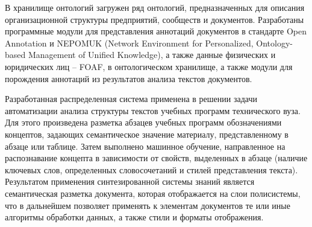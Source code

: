 \documentclass[12pt,a4paper]{ltxdoc}
\begin{document}
В хранилище онтологий загружен ряд онтологий, предназначенных для описания организационной структуры предприятий, сообществ и документов. Разработаны программные модули для представления аннотаций документов в стандарте Open Annotation и NEPOMUK (Network Environment for Personalized, Ontology-based Management of Unified Knowledge), а также данные физических и юридических лиц -- FOAF, в онтологическом хранилище, а также модули для порождения аннотаций из результатов анализа текстов документов.

Разработанная распределенная система применена в решении задачи автоматизации анализа структуры текстов учебных программ технического вуза. Для этого произведена разметка абзацев учебных программ обозначениями концептов, задающих семантическое значение материалу, представленному в абзаце или таблице. Затем выполнено машинное обучение, направленное на распознавание концепта в зависимости от свойств, выделенных в абзаце (наличие ключевых слов, определенных словосочетаний и стилей представления текста). Результатом применения синтезированной системы знаний является семантическая разметка документа, которая отображается на слои полисистемы, что в дальнейшем позволяет применять к элементам документов те или иные алгоритмы обработки данных, а также стили и форматы отображения.
\end{document}
